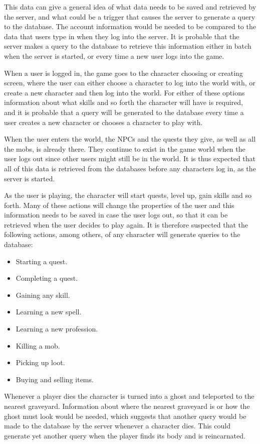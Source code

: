 This data can give a general idea of what data needs to be saved and retrieved by the server, and what could be a trigger that causes the server to generate a query to the database. The account information would be needed to be compared to the data that users type in when they log into the server. It is probable that the server makes a query to the database to retrieve this information either in batch when the server is started, or every time a new user logs into the game.

When a user is logged in, the game goes to the character choosing or creating screen, where the user can either choose a character to log into the world with, or create a new character and then log into the world. For either of these options information about what skills and so forth the character will have is required, and it is probable that a query will be generated to the database every time a user creates a new character or chooses a character to play with.

When the user enters the world, the NPCs and the quests they give, as well as all the mobs, is already there. They continue to exist in the game world when the user logs out since other users might still be in the world. It is thus expected that all of this data is retrieved from the databases before any characters log in, as the server is started.

As the user is playing, the character will start quests, level up, gain skills and so forth. Many of these actions will change the properties of the user and this information needs to be saved in case the user logs out, so that it can be retrieved when the user decides to play again. It is therefore suspected that the following actions, among others, of any character will generate queries to the database:

\begin{itemize}
	\item Starting a quest.
	\item Completing a quest.
	\item Gaining any skill.
	\item Learning a new spell.
	\item Learning a new profession.
	\item Killing a mob.
	\item Picking up loot.
	\item Buying and selling items.
\end{itemize}

Whenever a player dies the character is turned into a ghost and teleported to the nearest graveyard. Information about where the nearest graveyard is or how the ghost must look would be needed, which suggests that another query would be made to the database by the server whenever a character dies. This could generate yet another query when the player finds its body and is reincarnated. 

